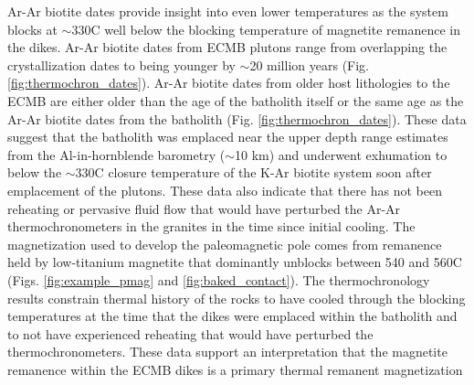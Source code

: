 \documentclass[draft]{agujournal2019}
\begin{document}
Ar-Ar biotite dates provide insight into even lower temperatures as the system blocks at $\sim$330\textdegree C \cite{Grove2001a} well below the blocking temperature of magnetite remanence in the dikes. Ar-Ar biotite dates from ECMB plutons range from overlapping the crystallization dates to being younger by $\sim$20 million years (Fig. \ref{fig:thermochron_dates}). Ar-Ar biotite dates from older host lithologies to the ECMB are either older than the age of the batholith itself or the same age as the Ar-Ar biotite dates from the batholith (Fig. \ref{fig:thermochron_dates}). These data suggest that the batholith was emplaced near the upper depth range estimates from the Al-in-hornblende barometry ($\sim$10 km) and underwent exhumation to below the $\sim$330\textdegree C closure temperature of the K-Ar biotite system soon after emplacement of the plutons. These data also indicate that there has not been reheating or pervasive fluid flow that would have perturbed the Ar-Ar thermochronometers in the granites in the time since initial cooling. The magnetization used to develop the paleomagnetic pole comes from remanence held by low-titanium magnetite that dominantly unblocks between 540 and 560\textdegree C (Figs. \ref{fig:example_pmag} and \ref{fig:baked_contact}). The thermochronology results constrain thermal history of the rocks to have cooled through the blocking temperatures at the time that the dikes were emplaced within the batholith and to not have experienced reheating that would have perturbed the thermochronometers. These data support an interpretation that the magnetite remanence within the ECMB dikes is a primary thermal remanent magnetization 
\end{document}
